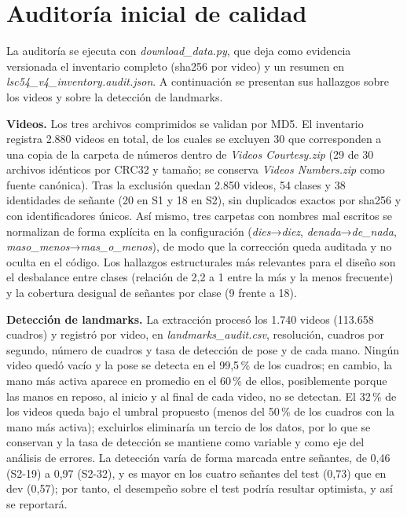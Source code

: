 \documentclass[11pt,a4paper]{article}
\newcommand{\code}[1]{\textit{#1}}
\begin{document}
\section{Auditoría inicial de calidad}

La auditoría se ejecuta con \code{download\_data.py}, que deja como evidencia versionada el inventario completo (sha256 por video) y un resumen en \code{lsc54\_v4\_inventory.audit.json}. A continuación se presentan sus hallazgos sobre los videos y sobre la detección de landmarks.

\textbf{Videos.} Los tres archivos comprimidos se validan por MD5. El inventario registra 2.880 videos en total, de los cuales se excluyen 30 que corresponden a una copia de la carpeta de números dentro de \code{Videos Courtesy.zip} (29 de 30 archivos idénticos por CRC32 y tamaño; se conserva \code{Videos Numbers.zip} como fuente canónica). Tras la exclusión quedan 2.850 videos, 54 clases y 38 identidades de señante (20 en S1 y 18 en S2), sin duplicados exactos por sha256 y con identificadores únicos. Así mismo, tres carpetas con nombres mal escritos se normalizan de forma explícita en la configuración (\code{dies}→\code{diez}, \code{denada}→\code{de\_nada}, \code{maso\_menos}→\code{mas\_o\_menos}), de modo que la corrección queda auditada y no oculta en el código. Los hallazgos estructurales más relevantes para el diseño son el desbalance entre clases (relación de 2,2 a 1 entre la más y la menos frecuente) y la cobertura desigual de señantes por clase (9 frente a 18).

\textbf{Detección de landmarks.} La extracción procesó los 1.740 videos (113.658 cuadros) y registró por video, en \code{landmarks\_audit.csv}, resolución, cuadros por segundo, número de cuadros y tasa de detección de pose y de cada mano. Ningún video quedó vacío y la pose se detecta en el 99,5\,\% de los cuadros; en cambio, la mano más activa aparece en promedio en el 60\,\% de ellos, posiblemente porque las manos en reposo, al inicio y al final de cada video, no se detectan. El 32\,\% de los videos queda bajo el umbral propuesto (menos del 50\,\% de los cuadros con la mano más activa); excluirlos eliminaría un tercio de los datos, por lo que se conservan y la tasa de detección se mantiene como variable y como eje del análisis de errores. La detección varía de forma marcada entre señantes, de 0,46 (S2-19) a 0,97 (S2-32), y es mayor en los cuatro señantes del test (0,73) que en dev (0,57); por tanto, el desempeño sobre el test podría resultar optimista, y así se reportará.
\end{document}
